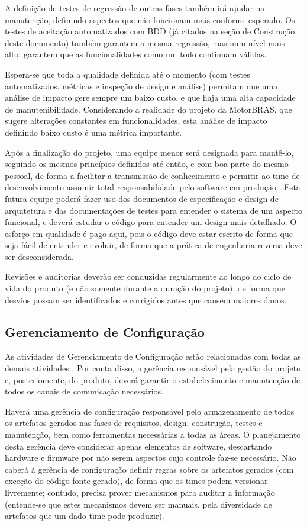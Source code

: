 \documentclass[12pt,journal,compsoc]{IEEEtran}
\begin{document}
A definição de testes de regressão de outras fases também irá ajudar na manutenção, definindo aspectos que não funcionam mais conforme esperado. Os testes de aceitação automatizados com BDD (já citados na seção de Construção deste documento) também garantem a mesma regressão, mas num nível mais alto: garantem que as funcionalidades como um todo continuam válidas. 

Espera-se que toda a qualidade definida até o momento (com testes automatizados, métricas e inspeção de design e análise) permitam que uma análise de impacto gere sempre um baixo custo, e que haja uma alta capacidade de manutenibilidade. Considerando a realidade do projeto da MotorBRAS, que sugere alterações constantes em funcionalidades, esta análise de impacto definindo baixo custo é uma métrica importante.

Após a finalização do projeto, uma equipe menor será designada para mantê-lo, seguindo os mesmos princípios definidos até então, e com boa parte do mesmo pessoal, de forma a facilitar a transmissão de conhecimento e permitir ao time de desenvolvimento assumir total responsabilidade pelo software em produção \cite{fowler_products_not_projects}. Esta futura equipe poderá fazer uso dos documentos de especificação e design de arquitetura e das documentações de testes para entender o sistema de um aspecto funcional, e deverá estudar o código para entender um design mais detalhado. O esforço em qualidade é pago aqui, pois o código deve estar escrito de forma que seja fácil de entender e evoluir, de forma que a prática de engenharia reversa deve ser desconsiderada. 

Revisões e auditorias \cite{society_software_2004} deverão ser conduzidas regularmente ao longo do ciclo de vida do produto (e não somente durante a
duração do projeto), de forma que desvios possam ser identificados e corrigidos antes que causem maiores danos.


\subsection{Gerenciamento de Configuração}

As atividades de Gerenciamento de Configuração estão relacionadas com todas
as demais atividades \cite{society_software_2004}. Por conta disso, a gerência
responsável pela gestão do projeto e, posteriomente, do produto, deverá
garantir o estabelecimento e manutenção de todos os canais de comunicação
necessários.

Haverá uma gerência de configuração responsável pelo armazenamento de todos os
artefatos gerados nas fases de requisitos, design, construção, testes e
manutenção, bem como ferramentas necessárias a todas as áreas. O planejamento
desta gerência deve considerar apenas elementos de software, descartando
hardware e firmware por não serem aspectos cujo controle faz-se necessário. Não
caberá à gerência de configuração definir regras sobre os artefatos gerados
(com exceção do código-fonte gerado), de forma que os times podem versionar
livremente; contudo, precisa prover mecanismos para auditar a informação
(entende-se que estes mecanismos devem ser manuais, pela diversidade de
artefatos que um dado time pode produzir). 
\end{document}
